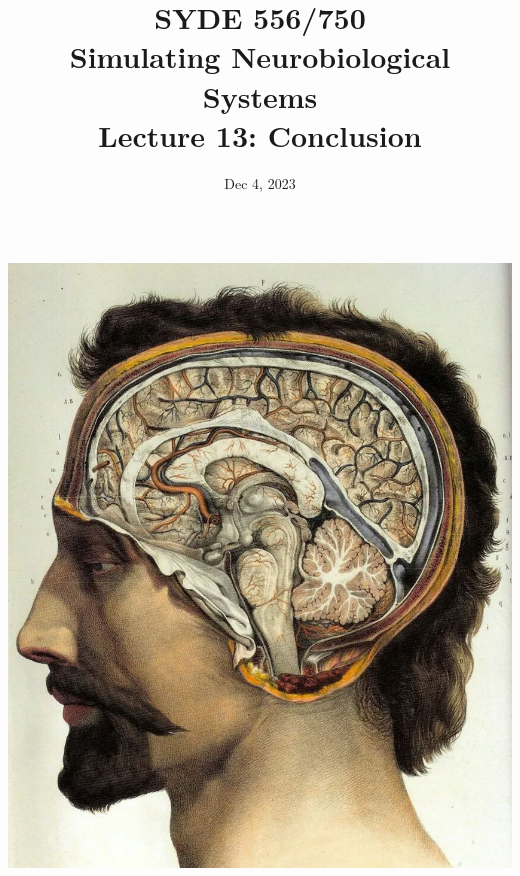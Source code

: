 \documentclass[handout,aspectratio=169]{beamer}
\date{Dec 4, 2023}
\title{SYDE 556/750 \\ Simulating Neurobiological Systems \\ Lecture 13: Conclusion}
\begin{document}
	
\begin{frame}{}
	\vspace{0.5cm}
	\begin{columns}[c]
		\MakeTitle
		\includegraphics[width=\textwidth]{media/jean_baptiste_marc_bourgery_atlas_of_anatomy_human_brain.jpg}
	\end{columns}
\end{frame}
\end{document}
